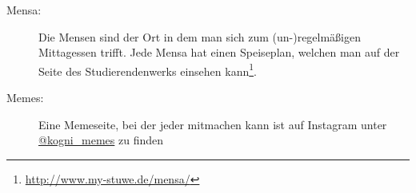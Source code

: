 \begin{description}
\item[Mensa:] Die Mensen sind der Ort in dem man sich zum (un-)regelmäßigen Mittagessen trifft. Jede Mensa hat einen Speiseplan, welchen man auf der Seite des Studierendenwerks einsehen kann\footnote{\url{http://www.my-stuwe.de/mensa/}}.	%

\item[Memes:] Eine Memeseite, bei der jeder mitmachen kann ist auf Instagram unter \href{https://www.instagram.com/kogni_memes/}{\faInstagram @kogni\_memes} zu finden

\vfill

\end{description}
\pagebreak
